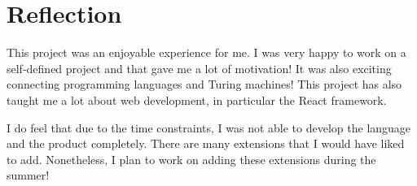 \section{Reflection}
This project was an enjoyable experience for me. I was very happy to work on a self-defined project and that gave me a lot of motivation! It was also exciting connecting programming languages and Turing machines! This project has also taught me a lot about web development, in particular the React framework.

I do feel that due to the time constraints, I was not able to develop the language and the product completely. There are many extensions that I would have liked to add. Nonetheless, I plan to work on adding these extensions during the summer!
